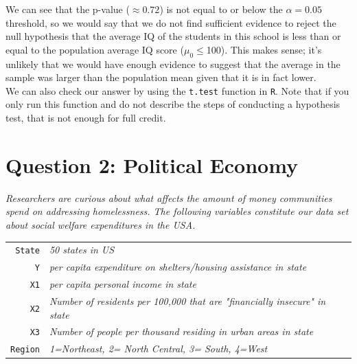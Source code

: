 \documentclass[12pt,letterpaper]{article}
\begin{document}
\begin{enumerate}
  
\vspace{.5cm}
\noindent We can see that the p-value ($\approx 0.72$) is not equal to or below the $\alpha=0.05$ threshold, so we would say that we do not find sufficient evidence to reject the null hypothesis that the average IQ of the students in this school is less than or equal to the population average IQ score ($\mu_0\leq$100). This makes sense; it's unlikely that we would have enough evidence to suggest that the average in the sample was larger than the population mean given that it is in fact lower.\\

\vspace{.15cm}
\noindent  We can also check our answer by using the \texttt{t.test} function in \texttt{R}. Note that if you only run this function and do not describe the steps of conducting a hypothesis test, that is not enough for full credit.\\

  
\end{enumerate}

\vspace{.5cm}
	\section*{Question 2: Political Economy}

\noindent \emph{Researchers are curious about what affects the amount of money communities spend on addressing homelessness. The following variables constitute our data set about social welfare expenditures in the USA. } \\
\vspace{.5cm}

\begin{tabular}{r|l}
	\texttt{State} &\emph{50 states in US} \\
	\texttt{Y} & \emph{per capita expenditure on shelters/housing assistance in state}\\
	\texttt{X1} &\emph{per capita personal income in state} \\
	\texttt{X2} &  \emph{Number of residents per 100,000 that are "financially insecure" in state}\\
	\texttt{X3} &  \emph{Number of people per thousand residing in urban areas in state} \\
	\texttt{Region} &  \emph{1=Northeast, 2= North Central, 3= South, 4=West} \\
\end{tabular}
\end{document}
